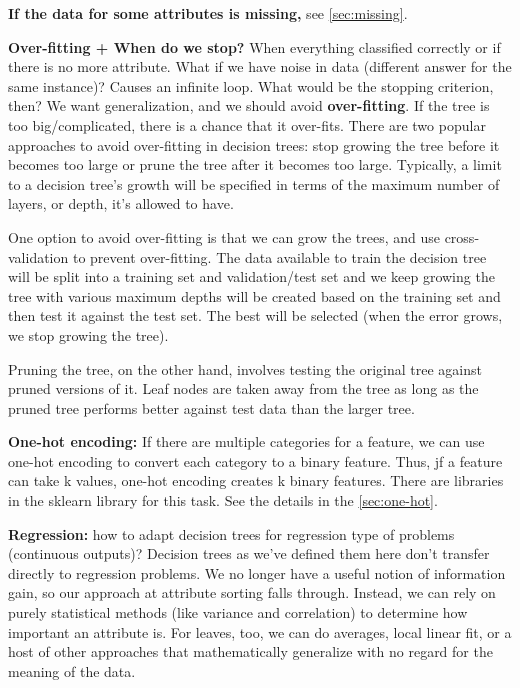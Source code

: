 \documentclass[12pt]{report}
\begin{document}
\textbf{If the data for some attributes is missing,} see \ref{sec:missing}.

\textbf{Over-fitting + When do we stop?} When everything classified correctly or if there is no more attribute. What if we have noise in data (different answer for the same instance)? Causes an infinite loop. What would be the stopping criterion, then? We want generalization, and we should avoid \textbf{over-fitting}. If the tree is too big/complicated, there is a chance that it over-fits. There are two popular approaches to avoid over-fitting in decision trees: stop growing the tree before it becomes too large or prune the tree after it becomes too large. Typically, a limit to a decision tree’s growth will be specified in terms of the maximum number of layers, or depth, it’s allowed to have.

One option to avoid over-fitting is that we can grow the trees, and use cross-validation to prevent over-fitting. The data available to train the decision tree will be split into a training set and validation/test set and we keep growing the tree with various maximum depths will be created based on the training set and then test it against the test set. The best will be selected (when the error grows, we stop growing the tree).

Pruning the tree, on the other hand, involves testing the original tree against pruned versions of it. Leaf nodes are taken away from the tree as long as the pruned tree performs better against test data than the larger tree.


\textbf{One-hot encoding:} If there are multiple categories for a feature, we can use one-hot encoding to convert each category to a binary feature. Thus, jf a feature can take k values, one-hot encoding creates k binary features. There are libraries in the sklearn library for this task. See the details in the \ref{sec:one-hot}.

\textbf{Regression:} how to adapt decision trees for regression type of problems (continuous outputs)? Decision trees as we’ve defined them here don’t transfer directly to regression problems. We no longer have a useful notion of information gain, so our approach at attribute sorting falls through. Instead, we can rely on purely statistical methods (like variance and correlation) to determine how important an attribute is. For leaves, too, we can do averages, local linear fit, or a host of other approaches that mathematically generalize with no regard for the meaning of the data.
\end{document}
